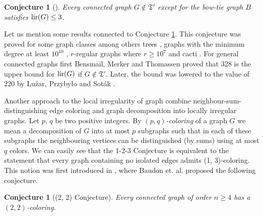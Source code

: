 \documentclass[12pt]{article}
\newtheorem{cnj}[tw]{Conjecture}
\begin{document}
\begin{cnj}[\cite{Sedlar Skrekovski 2}]
\label{graph3}
Every connected graph $G \notin \mathfrak{T'}$ except for the bow-tie graph $B$  satisfies ${\rm lir}(G)\leq 3$.
\end{cnj}
Let us mention some results connected to Conjecture \ref{graph3}. This conjecture was proved for some graph classes among others trees \cite{Baudon Bensmail}, graphs with the minimum degree at least $10^{10}$ \cite{Przybylo}, $r$-regular graphs where $r\geq 10^7$ \cite{Baudon Bensmail Przybylo Wozniak} and cacti \cite{Sedlar Skrekovski 2}. For general connected graphs first Bensmail, Merker and Thomassen \cite{Bensmail Merker Thomassen} proved that 328 is the upper bound for ${\rm lir}(G)$ if $G\notin \mathfrak{T'}$. Later, the bound was lowered to the value of 220 by Lu\v zar, Przybyło and Soták  \cite{Luzar Przybylo Sotak}.

Another approach to the local irregularity of graph combine neighbour-sum-distinguishing edge coloring and graph decomposition into locally irregular graphs. Let $p$, $q$ be two positive integers. By $(p, q)$\textit{-coloring} of a graph $G$ we mean a decomposition of $G$ into at most $p$ subgraphs such that in each of these subgraphs the neighbouring vertices can be distinguished (by sums) using at most $q$ colors. We can easily see that the 1-2-3 Conjecture is equivalent to the statement that every graph containing no isolated edges admits (1, 3)-coloring. This notion was first introduced in \cite{Baudon Bensmail Davot Hocquard}, where Baudon et. al. proposed the following conjecture.

\begin{cnj}[(2, 2) Conjecture]
\label{2,2}
Every connected graph of order $n\geq 4$ has a $(2,2)$-coloring.
\end{cnj}
\end{document}
